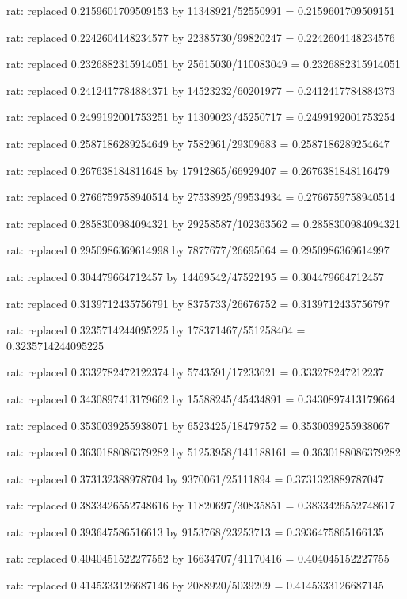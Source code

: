\documentclass[a4paper,10pt]{article}
\begin{document}
\begin{eulernotebook}
\begin{eulercomment}
\begin{eulercomment}
\begin{eulercomment}
\begin{eulercomment}
\begin{eulercomment}
\begin{eulercomment}
\begin{eulercomment}
\begin{eulercomment}
\begin{eulercomment}
\begin{eulercomment}
\begin{eulercomment}
\begin{eulercomment}
\begin{eulercomment}
\begin{eulercomment}
\begin{eulercomment}
\begin{eulercomment}
\begin{euleroutput}
  rat: replaced 0.2159601709509153 by 11348921/52550991 = 0.2159601709509151
  
  rat: replaced 0.2242604148234577 by 22385730/99820247 = 0.2242604148234576
  
  rat: replaced 0.2326882315914051 by 25615030/110083049 = 0.2326882315914051
  
  rat: replaced 0.2412417784884371 by 14523232/60201977 = 0.2412417784884373
  
  rat: replaced 0.2499192001753251 by 11309023/45250717 = 0.2499192001753254
  
  rat: replaced 0.2587186289254649 by 7582961/29309683 = 0.2587186289254647
  
  rat: replaced 0.267638184811648 by 17912865/66929407 = 0.2676381848116479
  
  rat: replaced 0.2766759758940514 by 27538925/99534934 = 0.2766759758940514
  
  rat: replaced 0.2858300984094321 by 29258587/102363562 = 0.2858300984094321
  
  rat: replaced 0.2950986369614998 by 7877677/26695064 = 0.2950986369614997
  
  rat: replaced 0.304479664712457 by 14469542/47522195 = 0.304479664712457
  
  rat: replaced 0.3139712435756791 by 8375733/26676752 = 0.3139712435756797
  
  rat: replaced 0.3235714244095225 by 178371467/551258404 = 0.3235714244095225
  
  rat: replaced 0.3332782472122374 by 5743591/17233621 = 0.333278247212237
  
  rat: replaced 0.3430897413179662 by 15588245/45434891 = 0.3430897413179664
  
  rat: replaced 0.3530039255938071 by 6523425/18479752 = 0.3530039255938067
  
  rat: replaced 0.3630188086379282 by 51253958/141188161 = 0.3630188086379282
  
  rat: replaced 0.373132388978704 by 9370061/25111894 = 0.3731323889787047
  
  rat: replaced 0.3833426552748616 by 11820697/30835851 = 0.3833426552748617
  
  rat: replaced 0.393647586516613 by 9153768/23253713 = 0.3936475865166135
  
  rat: replaced 0.4040451522277552 by 16634707/41170416 = 0.404045152227755
  
  rat: replaced 0.4145333126687146 by 2088920/5039209 = 0.4145333126687145
  

\end{euleroutput}
\end{eulercomment}
\end{eulercomment}
\end{eulercomment}
\end{eulercomment}
\end{eulercomment}
\end{eulercomment}
\end{eulercomment}
\end{eulercomment}
\end{eulercomment}
\end{eulercomment}
\end{eulercomment}
\end{eulercomment}
\end{eulercomment}
\end{eulercomment}
\end{eulercomment}
\end{eulercomment}
\end{eulernotebook}
\end{document}
